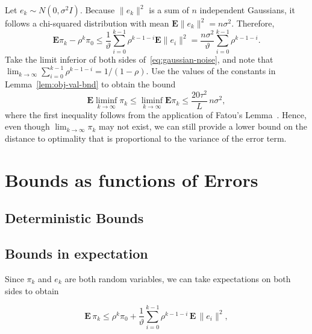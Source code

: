 \begin{example} \label{ex:expected-gaussian-noise} 

  Let $e_k\sim N(0,\sigma^2
  I)$. Because $\|e_k\|^2$ is a sum of $n$ independent Gaussians, it
  follows a chi-squared distribution with mean
  $\mathbf{E}\|e_k\|^2=n\sigma^2$. Therefore,
  \begin{equation}\label{eq:gaussian-noise}
    \mathbf{E}\pi_k-\rho^k\pi_0
    \le \frac{1}{\vartheta} \sum_{i=0}^{k-1}\rho^{k-1-i}\mathbf{E}\|e_{i}\|^2
    = \frac{n\sigma^2}{\vartheta} \sum_{i=0}^{k-1}\rho^{k-1-i}.
  \end{equation}
  Take the limit inferior of both sides of~\eqref{eq:gaussian-noise}, and note that
  $\lim_{k\to\infty}\sum_{i=0}^{k-1}\rho^{k-1-i}=1/(1-\rho) $.  Use
  the values of the constants in Lemma~\ref{lem:obj-val-bnd} to obtain
  the bound
  \[
  \mathbf{E}\liminf_{k\to\infty}\pi_k
  \le\liminf_{k\to\infty}\mathbf{E}\pi_k
  \le \frac{20 \tau^2}{L}\,n\sigma^2,
  \]
  where the first inequality follows from the application of Fatou's
  Lemma~\cite[Ch.~4]{RoydenF:2010}.  Hence, even though
  $\lim_{k\to\infty}\pi_k$ may not exist, we can still provide a lower
  bound on the distance to optimality that is proportional to the
  variance of the error term.
\end{example}

\section{Bounds as functions of Errors}

\subsection{Deterministic Bounds}


\subsection{Bounds in expectation}

Since $\pi_k$ and $e_k$ are both random variables, we can take
expectations on both sides to obtain

\begin{equation*}
  \mathbf{E}\,\pi_k  \le \rho^k \pi_0 
  + \frac{1}{\vartheta}
  \sum_{i=0}^{k-1}\rho^{k-1-i}\,\mathbf{E}\,\|e_i\|^2,
\end{equation*}

